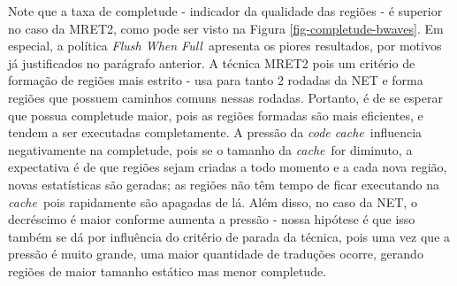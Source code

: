 \documentclass[12pt,twoside]{article}
\newcommand{\ccache}{\emph{code cache}}
\newcommand{\cache}{\emph{cache}}
\newcommand{\flush}{\emph{Flush When Full}}
\begin{document}
Note que a taxa de completude - indicador da qualidade das regiões - é superior no caso da MRET2, como pode ser visto na Figura \ref{fig-completude-bwaves}. Em especial, a política \flush~apresenta os piores resultados, por motivos já justificados no parágrafo anterior. A técnica MRET2 pois um critério de formação de regiões mais estrito - usa para tanto 2 rodadas da NET e forma regiões que possuem caminhos comuns nessas rodadas. Portanto, é de se esperar que possua completude maior, pois as regiões formadas são mais eficientes, e tendem a ser executadas completamente. A pressão da \ccache~influencia negativamente na completude, pois se o tamanho da \cache~for diminuto, a expectativa é de que regiões sejam criadas a todo momento e a cada nova região, novas estatísticas são geradas; as regiões não têm tempo de ficar executando na \cache~pois rapidamente são apagadas de lá. Além disso, no caso da NET, o decréscimo é maior conforme aumenta a pressão - nossa hipótese é que isso também se dá por influência do critério de parada da técnica, pois uma vez que a pressão é muito grande, uma maior quantidade de traduções ocorre, gerando regiões de maior tamanho estático mas menor completude.
\end{document}
